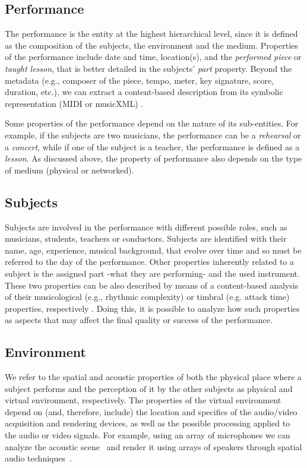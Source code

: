 \subsection{Performance}
The performance is the entity at the highest hierarchical level, since it is defined as the composition of the subjects, the environment and the medium. 
Properties of the performance include date and time, location(s), and the \textit{performed piece} or \textit{taught lesson}, that is better detailed in the subjects' \textit{part} property. Beyond the metadata (e.g., composer of the piece, tempo, meter, key signature, score, duration, etc.), we can extract a content-based description from its symbolic representation (MIDI or musicXML) \cite{MIDItoolbox}.

Some properties of the performance depend on the nature of its sub-entities. For example, if the subjects are two musicians, the performance can be a \textit{rehearsal} or a \textit{concert}, while if one of the subject is a teacher, the performance is defined as a \textit{lesson}. As discussed above, the property of performance also depends on the type of medium (physical or networked).  

\subsection{Subjects}
Subjects are involved in the performance with different possible roles, such as musicians, students, teachers or conductors. Subjects are identified with their name, age, experience, musical background, that evolve over time and so must be referred to the day of the performance. Other properties inherently related to a subject is the assigned part -what they are performing- and the used instrument. These two properties can be also described by means of a content-based analysis of their musicological (e.g., rhythmic complexity) or timbral (e.g. attack time) properties, respectively \cite{RottondiFeature}.
Doing this, it is possible to analyze how such properties as aspects that may affect the final quality or success of the performance.


\subsection{Environment}
We refer to the spatial and acoustic properties of both the physical place where a subject performs and the perception of it by the other subjects as physical and virtual environment, respectively. The properties of the virtual environment depend on (and, therefore, include) the location and specifics of the audio/video acquisition and rendering devices, as well as the possible processing applied to the audio or video signals. For example, using an array of microphones we can %
analyze the acoustic scene~\cite{Markovic2013} and render it using arrays of speakers through spatial audio techniques~\cite{bianchi2016}.

